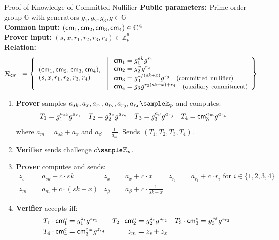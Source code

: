 \begin{protocol}{Proof of Knowledge of Committed Nullifier}{}
\label{prot:committed-nullifier}
\textbf{Public parameters:} Prime-order group $\mathbb{G}$ with generators $g_1, g_2, g_3, g \in \mathbb{G}$\\
\textbf{Common input:} $(\mathsf{cm}_1, \mathsf{cm}_2, \mathsf{cm}_3, \mathsf{cm}_4) \in \mathbb{G}^4$\\
\textbf{Prover input:} $(s, x, r_1, r_2, r_3, r_4) \in \mathbb{Z}_p^6$  \\
\textbf{Relation:} 
\[
\mathcal{R}_{\mathsf{cm}_{\mathsf{nf}}} = \left\{ 
\begin{array}{l} 
(\mathsf{cm}_1, \mathsf{cm}_2, \mathsf{cm}_3, \mathsf{cm}_4), \\
(s, x, r_1, r_2, r_3, r_4) 
\end{array}
\ \middle| \
\begin{array}{l}
\mathsf{cm}_1 = g_1^{sk} g^{r_1} \\
\mathsf{cm}_2 = g_2^{x} g^{r_2} \\
\mathsf{cm}_3 = g_3^{1/(sk + x)} g^{r_3}  \quad \text{\small{(committed nullifier)}}\\
\mathsf{cm}_4 = g_3 g^{r_3 (sk + x) + r_4}  \quad \text{\small{(auxiliary commitment)}}
\end{array} \right\}
\]
\begin{enumerate}
    \item \textbf{Prover} samples $a_{sk}, a_x, a_{r_1}, a_{r_2}, a_{r_3}, a_{r_4} \sample \mathbb{Z}_p$ and computes:
    \begin{align*}
        T_1 &= g_1^{a_{sk}} g^{a_{r_1}} & T_2 &= g_2^{a_x} g^{a_{r_2}} &
        T_3 &= g_3^{a_{\beta}} g^{a_{r_3}} & T_4 &= \mathsf{cm}_3^{a_m} g^{a_{r_4}}
    \end{align*}
    where $a_m = a_{sk} + a_x$ and $a_{\beta} = \frac{1}{a_m}$. Sends $(T_1, T_2, T_3, T_4)$.
    
    \item \textbf{Verifier} sends challenge $c \sample \mathbb{Z}_p$.
    
    \item \textbf{Prover} computes and sends:
    \begin{align*}
        z_{s} &= a_{sk} + c \cdot sk & z_x &= a_x + c \cdot x &  z_{r_i} &= a_{r_i} + c \cdot r_i \text{ for } i \in \{1,2,3,4\} \\
        z_m &= a_m + c \cdot (sk + x) & z_{\beta} &= a_{\beta} + c \cdot \frac{1}{sk + x}
    \end{align*}
    
    \item \textbf{Verifier} accepts iff:
    \begin{align*}
        T_1 \cdot \mathsf{cm}_1^c &= g_1^{z_{s}} g^{z_{r_1}} 
        & 
        T_2 \cdot \mathsf{cm}_2^c &= g_2^{z_x} g^{z_{r_2}} 
        &
        T_3 \cdot \mathsf{cm}_3^c &= g_3^{z_{\beta}} g^{z_{r_3}} \\
        T_4 \cdot \mathsf{cm}_4^c &= \mathsf{cm}_3^{z_m} g^{z_{r_4}}
        &
        z_m &= z_{s} + z_x
    \end{align*}
\end{enumerate}
\end{protocol}



